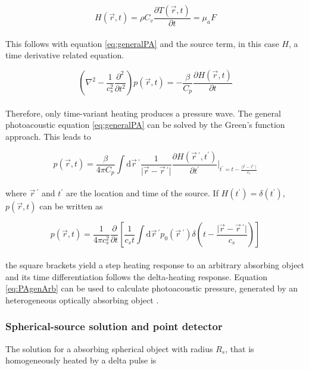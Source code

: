 \begin{equation}
	H(\vec{r},t) = \rho C_v \frac{\partial T(\vec{r},t)}{\partial t} = \mu_a F
\end{equation}
\\
This follows with equation \ref{eq:generalPA} and the source term, in this case $H$, a time derivative related equation. 

\begin{equation}
		\left( \nabla^2 - \frac{1}{c_s^2} \frac{\partial^2}{\partial t^2}\right)p(\vec{r},t) = - \frac{\beta}{C_p}\frac{\partial H(\vec{r},t)}{\partial t}
\end{equation}
\\
Therefore, only time-variant heating produces a pressure wave. The general photoacoustic equation \ref{eq:generalPA} can be solved by the Green's function approach. This leads to

\begin{equation}
	p(\vec{r},t) = \frac{\beta}{4 \pi C_p} \int \mathrm{d} \vec{r}\,^{'} \frac{1}{\vert \vec{r} - \vec{r}\,^{'} \vert} \frac{\partial H(\vec{r}\,^{'}, t^{'})}{\partial t^{'}} \Bigg|_{ t^{'}=t-\frac{\vert \vec{r}-\vec{r}\,^{'} \vert}{c_s}}
\end{equation} 
\\
where $\vec{r}\,^{'}$ and $t^{'}$ are the location and time  of the source. If $H(t^{'}) = \delta (t^{'})$, $p(\vec{r},t)$ can be written as

\begin{equation}
	p(\vec{r},t) = \frac{1}{4 \pi c_s^2} \frac{\partial}{\partial t} \left[ \frac{1}{c_s t} \int \mathrm{d}\vec{r}\,^{'} p_0(\vec{r}\,^{'}) \delta \left(t-\frac{\vert \vec{r} - \vec{r}\,^{'}\vert}{c_s}\right)\right]
	\label{eq:PAgenArb}
\end{equation}
\\
the square brackets yield a step heating response to an arbitrary absorbing object and its time differentiation follows the delta-heating response. Equation \ref{eq:PAgenArb} can be used to calculate photoacoustic pressure, generated by an heterogeneous optically absorbing object \cite{Wang:PAMtutorial}.\\

\subsubsection{Spherical-source solution and point detector}

The solution for a absorbing spherical object with radius $R_s$, that is homogeneously heated by a delta pulse is

